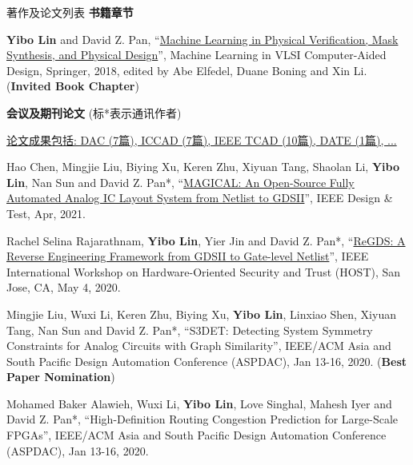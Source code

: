\begin{rSection}{著作及论文列表}
\textbf{书籍章节}
        

\begin{description}[font=\normalfont, rightmargin=2em]
    

\item[{[B1]}]{
        \textbf{Yibo Lin} and David Z. Pan, 
    ``\href{http://dx.doi.org/10.1007/978-3-030-04666-8_4}{Machine Learning in Physical Verification, Mask Synthesis, and Physical Design}'', 
    Machine Learning in VLSI Computer-Aided Design, Springer, 2018, edited by Abe Elfedel, Duane Boning and Xin Li.
    (\textbf{Invited Book Chapter})
}
            

\end{description}
    

\textbf{会议及期刊论文} (标*表示通讯作者)
        

            \underline{论文成果包括: DAC (7篇), ICCAD (7篇), IEEE TCAD (10篇), DATE (1篇), ...} 
    

\begin{description}[font=\normalfont, rightmargin=2em]
    

\item[{[J52]}]{
        Hao Chen, Mingjie Liu, Biying Xu, Keren Zhu, Xiyuan Tang, Shaolan Li, \textbf{Yibo Lin}, Nan Sun and David Z. Pan*, 
    ``\href{https://doi.org/10.1109/MDAT.2020.3024153}{MAGICAL: An Open-Source Fully Automated Analog IC Layout System from Netlist to GDSII}'', 
    IEEE Design \& Test, Apr, 2021.
    
}
            

\item[{[C51]}]{
        Rachel Selina Rajarathnam, \textbf{Yibo Lin}, Yier Jin and David Z. Pan*, 
    ``\href{https://doi.org/10.1109/HOST45689.2020.9300272}{ReGDS: A Reverse Engineering Framework from GDSII to Gate-level Netlist}'', 
    IEEE International Workshop on Hardware-Oriented Security and Trust (HOST), San Jose, CA, May 4, 2020.
    
}
            

\item[{[C50]}]{
        Mingjie Liu, Wuxi Li, Keren Zhu, Biying Xu, \textbf{Yibo Lin}, Linxiao Shen, Xiyuan Tang, Nan Sun and David Z. Pan*, 
    ``S3DET: Detecting System Symmetry Constraints for Analog Circuits with Graph Similarity'', 
    IEEE/ACM Asia and South Pacific Design Automation Conference (ASPDAC), Jan 13-16, 2020.
    (\textbf{Best Paper Nomination})
}
            

\item[{[C49]}]{
        Mohamed Baker Alawieh, Wuxi Li, \textbf{Yibo Lin}, Love Singhal, Mahesh Iyer and David Z. Pan*, 
    ``High-Definition Routing Congestion Prediction for Large-Scale FPGAs'', 
    IEEE/ACM Asia and South Pacific Design Automation Conference (ASPDAC), Jan 13-16, 2020.
    
}
\end{description}
\end{rSection}
